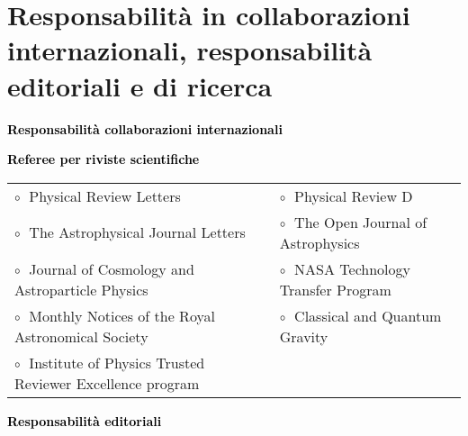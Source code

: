 \vspace{0.2cm}
\section{Responsabilità in collaborazioni internazionali, responsabilità editoriali e di ricerca}

\textbf{\textcolor{black}{Responsabilità collaborazioni internazionali}}
\vspace{0.1cm}



\textbf{\textcolor{black}{Referee per riviste scientifiche}}
\vspace{0.1cm}

\begin{tabular}{@{\hskip 0.4cm}l@{\hskip 0.4in}l}
$\circ\;$ Physical Review Letters & $\circ\;$ Physical Review D \\
$\circ\;$ The Astrophysical Journal Letters  &  $\circ\;$  The Open Journal of Astrophysics  \\
$\circ\;$ Journal of Cosmology and Astroparticle Physics & $\circ\;$ NASA Technology Transfer Program \\
$\circ\;$ Monthly Notices of the Royal Astronomical Society& $\circ\;$ Classical and Quantum Gravity\\
$\circ\;$ Institute of Physics Trusted Reviewer Excellence program \\
\end{tabular}

\vspace{0.2cm}
\textbf{\textcolor{black}{Responsabilità editoriali}}
\vspace{0.1cm}


\vspace{-0.1cm}

